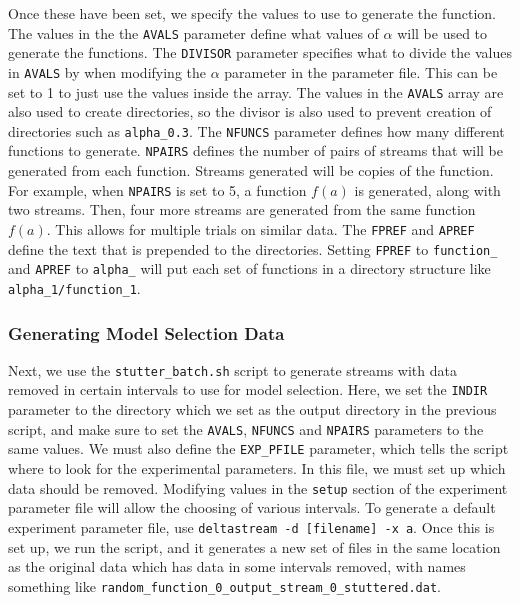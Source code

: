 \documentclass[a4paper,11pt,twoside]{article}
\begin{document}
\begin{appendices}
    Once these have been set, we specify the values to use to generate the
    function. The values in the the \texttt{AVALS} parameter define what values of
    $\alpha$ will be used to generate the functions. The \texttt{DIVISOR} parameter
    specifies what to divide the values in \texttt{AVALS} by when modifying the
    $\alpha$ parameter in the parameter file. This can be set to 1 to just use the
    values inside the array. The values in the \texttt{AVALS} array are also used to
    create directories, so the divisor is also used to prevent creation of
    directories such as \texttt{alpha\_0.3}. The \texttt{NFUNCS} parameter defines
    how many different functions to generate. \texttt{NPAIRS} defines the number of
    pairs of streams that will be generated from each function. Streams generated
    will be copies of the function. For example, when \texttt{NPAIRS} is set to 5, a
    function $f(a)$ is generated, along with two streams. Then, four more streams
    are generated from the same function $f(a)$. This allows for multiple trials on
    similar data. The \texttt{FPREF} and \texttt{APREF} define the text that is
    prepended to the directories. Setting \texttt{FPREF} to \texttt{function\_} and
    \texttt{APREF} to \texttt{alpha\_} will put each set of functions in a directory
    structure like \texttt{alpha\_1/function\_1}.
\subsubsection{Generating Model Selection Data}
\label{sec-10-3-2}

    Next, we use the \texttt{stutter\_batch.sh} script to generate streams with data
    removed in certain intervals to use for model selection. Here, we set the
    \texttt{INDIR} parameter to the directory which we set as the output directory
    in the previous script, and make sure to set the \texttt{AVALS}, \texttt{NFUNCS}
    and \texttt{NPAIRS} parameters to the same values. We must also define the
    \texttt{EXP\_PFILE} parameter, which tells the script where to look for the
    experimental parameters. In this file, we must set up which data should be
    removed. Modifying values in the \texttt{setup} section of the experiment
    parameter file will allow the choosing of various intervals. To generate a
    default experiment parameter file, use \texttt{deltastream -d [filename] -x
    a}. Once this is set up, we run the script, and it generates a new set of files
    in the same location as the original data which has data in some intervals
    removed, with names something like \texttt{random\_function\_0\_output\_stream\_0\_stuttered.dat}.

\end{appendices}
\end{document}

